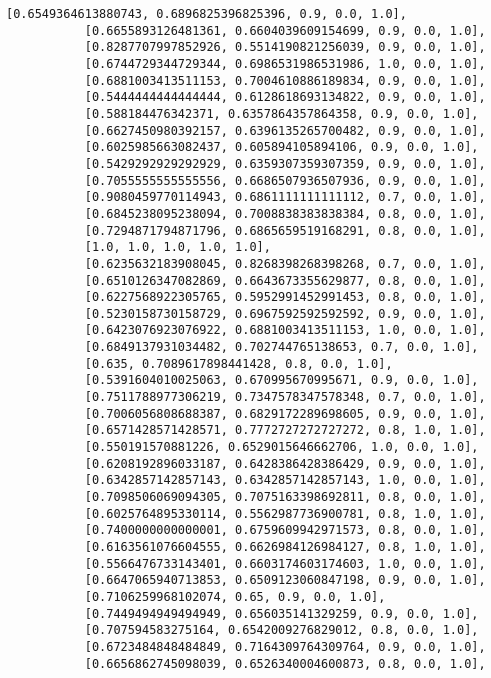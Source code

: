 \documentclass[11pt]{article}
\begin{document}
\begin{Verbatim}[commandchars=\\\{\}]
           [0.6549364613880743, 0.6896825396825396, 0.9, 0.0, 1.0],
           [0.6655893126481361, 0.6604039609154699, 0.9, 0.0, 1.0],
           [0.8287707997852926, 0.5514190821256039, 0.9, 0.0, 1.0],
           [0.6744729344729344, 0.6986531986531986, 1.0, 0.0, 1.0],
           [0.6881003413511153, 0.7004610886189834, 0.9, 0.0, 1.0],
           [0.5444444444444444, 0.6128618693134822, 0.9, 0.0, 1.0],
           [0.588184476342371, 0.6357864357864358, 0.9, 0.0, 1.0],
           [0.6627450980392157, 0.6396135265700482, 0.9, 0.0, 1.0],
           [0.6025985663082437, 0.605894105894106, 0.9, 0.0, 1.0],
           [0.5429292929292929, 0.6359307359307359, 0.9, 0.0, 1.0],
           [0.7055555555555556, 0.6686507936507936, 0.9, 0.0, 1.0],
           [0.9080459770114943, 0.6861111111111112, 0.7, 0.0, 1.0],
           [0.6845238095238094, 0.7008838383838384, 0.8, 0.0, 1.0],
           [0.7294871794871796, 0.6865659519168291, 0.8, 0.0, 1.0],
           [1.0, 1.0, 1.0, 1.0, 1.0],
           [0.6235632183908045, 0.8268398268398268, 0.7, 0.0, 1.0],
           [0.6510126347082869, 0.6643673355629877, 0.8, 0.0, 1.0],
           [0.6227568922305765, 0.5952991452991453, 0.8, 0.0, 1.0],
           [0.5230158730158729, 0.6967592592592592, 0.9, 0.0, 1.0],
           [0.6423076923076922, 0.6881003413511153, 1.0, 0.0, 1.0],
           [0.6849137931034482, 0.702744765138653, 0.7, 0.0, 1.0],
           [0.635, 0.7089617898441428, 0.8, 0.0, 1.0],
           [0.5391604010025063, 0.670995670995671, 0.9, 0.0, 1.0],
           [0.7511788977306219, 0.7347578347578348, 0.7, 0.0, 1.0],
           [0.7006056808688387, 0.6829172289698605, 0.9, 0.0, 1.0],
           [0.6571428571428571, 0.7772727272727272, 0.8, 1.0, 1.0],
           [0.550191570881226, 0.6529015646662706, 1.0, 0.0, 1.0],
           [0.6208192896033187, 0.6428386428386429, 0.9, 0.0, 1.0],
           [0.6342857142857143, 0.6342857142857143, 1.0, 0.0, 1.0],
           [0.7098506069094305, 0.7075163398692811, 0.8, 0.0, 1.0],
           [0.6025764895330114, 0.5562987736900781, 0.8, 1.0, 1.0],
           [0.7400000000000001, 0.6759609942971573, 0.8, 0.0, 1.0],
           [0.6163561076604555, 0.6626984126984127, 0.8, 1.0, 1.0],
           [0.5566476733143401, 0.6603174603174603, 1.0, 0.0, 1.0],
           [0.6647065940713853, 0.6509123060847198, 0.9, 0.0, 1.0],
           [0.7106259968102074, 0.65, 0.9, 0.0, 1.0],
           [0.7449494949494949, 0.656035141329259, 0.9, 0.0, 1.0],
           [0.707594583275164, 0.6542009276829012, 0.8, 0.0, 1.0],
           [0.6723484848484849, 0.7164309764309764, 0.9, 0.0, 1.0],
           [0.6656862745098039, 0.6526340004600873, 0.8, 0.0, 1.0],

\end{Verbatim}
\end{document}
